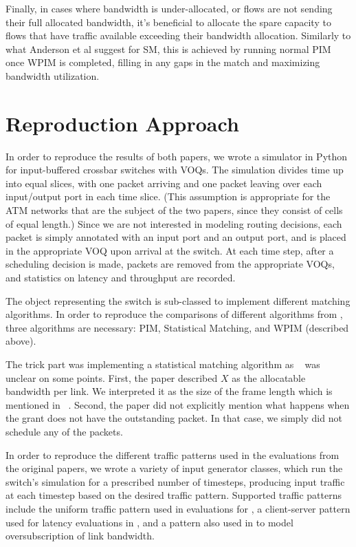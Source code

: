 Finally, in cases where bandwidth is under-allocated, or flows are not sending their full allocated bandwidth, it's beneficial to allocate the spare capacity to flows that have traffic available exceeding their bandwidth allocation. Similarly to what Anderson et al suggest for SM, this is achieved by running normal PIM once WPIM is completed, filling in any gaps in the match and maximizing bandwidth utilization.

\section{Reproduction Approach}
In order to reproduce the results of both papers, we wrote a simulator in Python for input-buffered crossbar switches with VOQs. The simulation divides time up into equal slices, with one packet arriving and one packet leaving over each input/output port in each time slice. (This assumption is appropriate for the ATM networks that are the subject of the two papers, since they consist of cells of equal length.) Since we are not interested in modeling routing decisions, each packet is simply annotated with an input port and an output port, and is placed in the appropriate VOQ upon arrival at the switch. At each time step, after a scheduling decision is made, packets are removed from the appropriate VOQs, and statistics on latency and throughput are recorded.

The object representing the switch is sub-classed to implement different matching algorithms. In order to reproduce the comparisons of different algorithms from \cite{stiliadis}, three algorithms are necessary: PIM, Statistical Matching, and WPIM (described above). 

The trick part was implementing a statistical matching algorithm as ~\cite{anderson} was unclear on some points. First, the paper described $X$ as the allocatable bandwidth per link. We interpreted it as the size of the frame length which is mentioned in ~\cite{stiliadis}. Second, the paper did not explicitly mention what happens when the grant does not have the outstanding packet. In that case, we simply did not schedule any of the packets.

In order to reproduce the different traffic patterns used in the evaluations from the original papers, we wrote a variety of input generator classes, which run the switch's simulation for a prescribed number of timesteps, producing input traffic at each timestep based on the desired traffic pattern. Supported traffic patterns include the uniform traffic pattern used in evaluations for \cite{anderson}, a client-server pattern used for latency evaluations in \cite{stiliadis}, and a pattern also used in \cite{stiliadis} to model oversubscription of link bandwidth.

